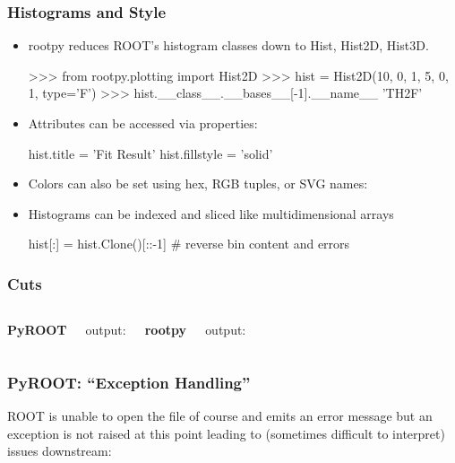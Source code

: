 \documentclass[10pt,professionalfonts,serif,usenames,dvipsnames,svgnames,table]{beamer}
\begin{document}
\begin{frame}[fragile]
    \frametitle{Histograms and Style}
    \begin{itemize}
        \item rootpy reduces ROOT's histogram classes down to Hist, Hist2D,
            Hist3D.
\begin{pyglist}[language=python,style=vs]
>>> from rootpy.plotting import Hist2D
>>> hist = Hist2D(10, 0, 1, 5, 0, 1, type='F')
>>> hist.__class__.__bases__[-1].__name__
'TH2F'
\end{pyglist}
\item Attributes can be accessed via properties:
\begin{pyglist}[language=python,texcl=true,style=vs]
hist.title = 'Fit Result'
hist.fillstyle = 'solid'
\end{pyglist}
\item Colors can also be set using hex, RGB tuples, or SVG names:
\item Histograms can be indexed and sliced like multidimensional arrays
\begin{pyglist}[language=python,texcl=true,style=vs]
hist[:] = hist.Clone()[::-1]  # reverse bin content and errors
\end{pyglist}
\end{itemize}
\end{frame}

\begin{frame}[fragile]
    \frametitle{Cuts}
    \begin{columns}
        {\bf PyROOT}
        
        \vspace{-.3cm}
        output:
        \vspace{-.3cm}
        
        {\bf rootpy}
        
        \vspace{-.3cm}
        output:
        \vspace{-.3cm}
        
    \end{columns}
\end{frame}

\begin{frame}[fragile]
    \frametitle{PyROOT: ``Exception Handling''}

ROOT is unable to open the file of course and emits an error message but an
exception is not raised at this point leading to (sometimes difficult to
interpret) issues downstream:

    
    \vspace{-.5cm}
    
\end{frame}
\end{document}
